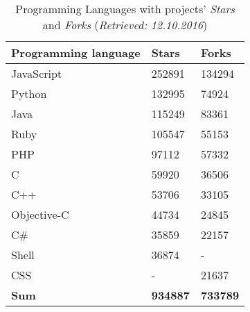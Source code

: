 \begin{table}[!h]
\centering
\begin{tabular}{lll}

\hline
\textbf{Programming language} & \textbf{Stars} & \textbf{Forks} \\ \hline
JavaScript        & 252891        & 134294         \\
Python            & 132995        & 74924          \\
Java              & 115249        & 83361          \\
Ruby              & 105547        & 55153          \\
PHP               & 97112         & 57332          \\
C                 & 59920         & 36506          \\
C++               & 53706         & 33105          \\
Objective-C       & 44734         & 24845          \\
C\#               & 35859         & 22157          \\
Shell             & 36874         & -              \\
CSS               & -             & 21637          \\ \hline
\textbf{Sum}      & \textbf{934887}     & \textbf{733789}         \\ \hline

\end{tabular}
\caption{Programming Languages with projects' \textit{Stars} and \textit{Forks} (\textit{Retrieved: 12.10.2016})}
\label{tbl:github_language_distr_top_repos}
\end{table}
